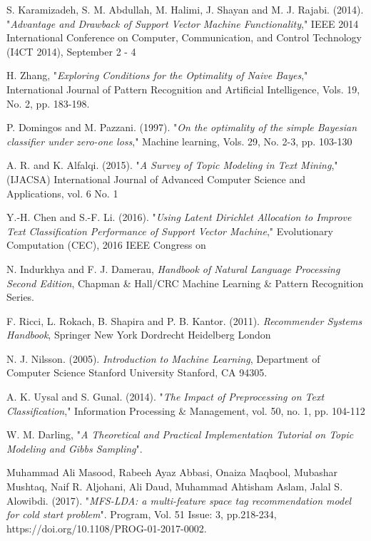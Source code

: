 
\begin{thebibliography}{19}
	
{S. Karamizadeh, S. M. Abdullah, M. Halimi, J. Shayan and M. J. Rajabi. (2014). "\emph{Advantage and Drawback of Support Vector Machine Functionality}," IEEE 2014 International Conference on Computer, Communication, and Control Technology (I4CT 2014), September 2 - 4}

{H. Zhang, "\emph{Exploring Conditions for the Optimality of Naive Bayes}," International Journal of Pattern Recognition and Artificial Intelligence, Vols. 19, No. 2, pp. 183-198.}

{P. Domingos and M. Pazzani. (1997). "\emph{On the optimality of the simple Bayesian classifier under zero-one loss}," Machine learning, Vols. 29, No. 2-3, pp. 103-130}

{A. R. and K. Alfalqi. (2015). "\emph{A Survey of Topic Modeling in Text Mining}," (IJACSA) International Journal of Advanced Computer Science and Applications, vol. 6 No. 1}

{Y.-H. Chen and S.-F. Li. (2016). "\emph{Using Latent Dirichlet Allocation to Improve Text Classification Performance of Support Vector Machine}," Evolutionary Computation (CEC), 2016 IEEE Congress on}

{N. Indurkhya and F. J. Damerau, \emph{Handbook of Natural Language Processing Second Edition}, Chapman \& Hall/CRC Machine Learning \& Pattern Recognition Series.}

{F. Ricci, L. Rokach, B. Shapira and P. B. Kantor. (2011). \emph{Recommender Systems Handbook}, Springer New York Dordrecht Heidelberg London}

{N. J. Nilsson. (2005). \emph{Introduction to Machine Learning}, Department of Computer Science Stanford University Stanford, CA 94305.}

{A. K. Uysal and S. Gunal. (2014). "\emph{The Impact of Preprocessing on Text Classification}," Information Processing \& Management, vol. 50, no. 1, pp. 104-112}

{W. M. Darling, "\emph{A Theoretical and Practical Implementation Tutorial on Topic Modeling and Gibbs Sampling}".}

{Muhammad Ali Masood, Rabeeh Ayaz Abbasi, Onaiza Maqbool, Mubashar Mushtaq, Naif R. Aljohani, Ali Daud, Muhammad Ahtisham Aslam, Jalal S. Alowibdi. (2017). "\emph{MFS-LDA: a multi-feature space tag recommendation model for cold start problem}". Program, Vol. 51 Issue: 3, pp.218-234, https://doi.org/10.1108/PROG-01-2017-0002.}


\end{thebibliography}

